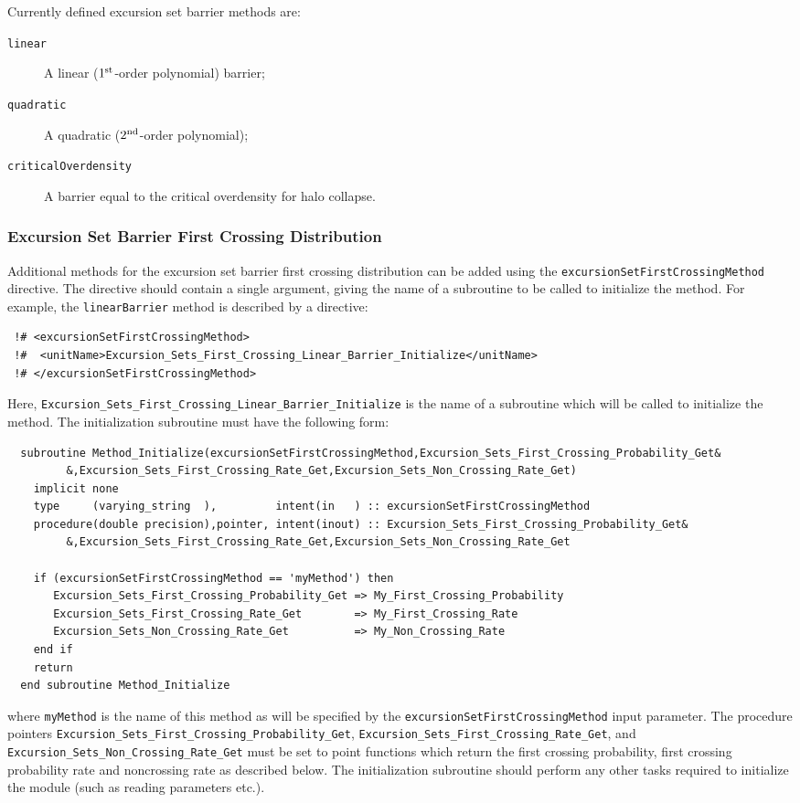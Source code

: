 Currently defined excursion set barrier methods are:
\begin{description}
 \item [{\tt linear}] A linear ($1^{\rm st}$-order polynomial) barrier;
  \item [{\tt quadratic}] A quadratic ($2^{\rm nd}$-order polynomial);
  \item [{\tt criticalOverdensity}] A barrier equal to the critical overdensity for halo collapse.
\end{description}

\subsubsection{Excursion Set Barrier First Crossing Distribution}\label{sec:excursionSetFirstCrossingMethod}

Additional methods for the excursion set barrier first crossing distribution can be added using the {\tt excursionSetFirstCrossingMethod} directive. The directive should contain a single argument, giving the name of a subroutine to be called to initialize the method. For example, the {\tt linearBarrier} method is described by a directive:
\begin{verbatim}
 !# <excursionSetFirstCrossingMethod>
 !#  <unitName>Excursion_Sets_First_Crossing_Linear_Barrier_Initialize</unitName>
 !# </excursionSetFirstCrossingMethod>
\end{verbatim}
Here, {\tt Excursion\_Sets\_First\_Crossing\_Linear\_Barrier\_Initialize} is the name of a subroutine which will be called to initialize the method. The initialization subroutine must have the following form:
\begin{verbatim}
  subroutine Method_Initialize(excursionSetFirstCrossingMethod,Excursion_Sets_First_Crossing_Probability_Get&
         &,Excursion_Sets_First_Crossing_Rate_Get,Excursion_Sets_Non_Crossing_Rate_Get)
    implicit none
    type     (varying_string  ),         intent(in   ) :: excursionSetFirstCrossingMethod
    procedure(double precision),pointer, intent(inout) :: Excursion_Sets_First_Crossing_Probability_Get&
         &,Excursion_Sets_First_Crossing_Rate_Get,Excursion_Sets_Non_Crossing_Rate_Get
    
    if (excursionSetFirstCrossingMethod == 'myMethod') then
       Excursion_Sets_First_Crossing_Probability_Get => My_First_Crossing_Probability
       Excursion_Sets_First_Crossing_Rate_Get        => My_First_Crossing_Rate
       Excursion_Sets_Non_Crossing_Rate_Get          => My_Non_Crossing_Rate
    end if
    return
  end subroutine Method_Initialize
\end{verbatim}
where {\tt myMethod} is the name of this method as will be specified by the {\tt excursionSetFirstCrossingMethod} input parameter. The procedure pointers {\tt Excursion\_Sets\_First\_Crossing\_Probability\_Get}, {\tt Excursion\_Sets\_First\_Crossing\_Rate\_Get}, and {\tt Excursion\_Sets\_Non\_Crossing\_Rate\_Get} must be set to point functions which return the first crossing probability, first crossing probability rate and noncrossing rate as described below. The initialization subroutine should perform any other tasks required to initialize the module (such as reading parameters etc.).

